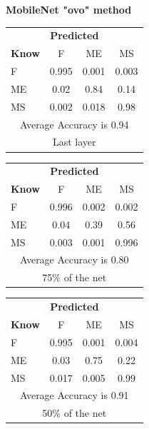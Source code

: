\documentclass[12pt]{article} %
\begin{document}
\begin{center}
\textbf{ MobileNet "ovo" method}
\end{center}
\begin{minipage}{0.5\textwidth}
\begin{center}
\begin{tabular}{l|c|c|c|}
 \multicolumn{4}{c}{ \textbf{ Predicted}}\\
 \textbf{Know}&F&ME&MS\\ \hline\hline
F   &0.995&0.001&0.003\\
ME &0.02&0.84&0.14\\
MS &0.002&0.018&0.98\\
\multicolumn{4}{c}{Average Accuracy is 0.94}\\
\multicolumn{4}{c}{Last layer}\\
\end{tabular}
\end{center}
\end{minipage}
\begin{minipage}{0.5\textwidth}
\begin{center}
\begin{tabular}{l|c|c|c|}
 \multicolumn{4}{c}{ \textbf{ Predicted}}\\
 \textbf{Know}&F&ME&MS\\ \hline\hline
F    &0.996&0.002&0.002\\
ME &0.04&0.39&0.56\\
MS &0.003&0.001&0.996\\
\multicolumn{4}{c}{Average Accuracy is 0.80}\\
\multicolumn{4}{c}{75\%  of the net}\\
\end{tabular}
\end{center}
\end{minipage}
\begin{minipage}{0.5\textwidth}
\begin{center}
\begin{tabular}{l|c|c|c|}
 \multicolumn{4}{c}{ \textbf{ Predicted}}\\
 \textbf{Know}&F&ME&MS\\ \hline\hline
F   &0.995&0.001&0.004\\
ME &0.03&0.75&0.22\\
MS &0.017&0.005&0.99\\
\multicolumn{4}{c}{Average Accuracy is 0.91}\\
\multicolumn{4}{c}{50\%  of the net}\\
\end{tabular}
\end{center}
\end{minipage}
\end{document}
